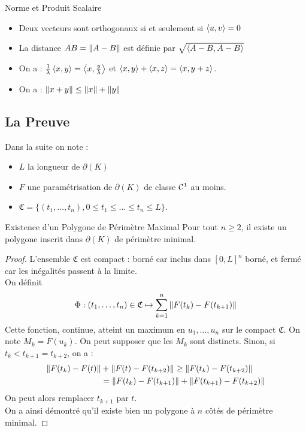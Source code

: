 \documentclass{cours}
\begin{document}
\begin{propositionfr}{Norme et Produit Scalaire}{}
    \begin{itemize}
        \item Deux vecteurs sont orthogonaux si et seulement si $\left\langle u, v \right\rangle = 0$
        \item La distance $AB = \left\lVert A - B \right\rVert$ est définie par $\sqrt{\left\langle A - B, A - B \right\rangle}$
        \item On a : $\frac{1}{\lambda} \left\langle x, y \right\rangle = \left\langle x, {y \over \lambda} \right\rangle$ et $\left\langle x, y \right\rangle + \left\langle x, z \right\rangle = \left\langle x, y + z \right\rangle$.
        \item On a : $\left\lVert x + y \right\rVert \leq \left\lVert x \right\rVert + \left\lVert y \right\rVert$
    \end{itemize}
\end{propositionfr}

\subsection{La Preuve}

Dans la suite on note :
\begin{itemize}
    \item $L$ la longueur de $\partial(K)$
    \item $F$ une paramétrisation de $\partial(K)$ de classe $\mathcal{C}^{1}$ au moins.
    \item $\mathfrak{C}= \{\left(t_{1}, \ldots, t_{n}\right), 0 \leq t_{1} \leq \dots \leq t_{n}\leq L\}$.
\end{itemize}

\begin{propositionfr}{Existence d'un Polygone de Périmètre Maximal}{}
    Pour tout $n \geq 2$, il existe un polygone inscrit dans $\partial(K)$ de périmètre minimal.
\end{propositionfr}
\begin{proof}
    L'ensemble $\mathfrak{C}$ est compact : borné car inclus dans $\left[0, L\right]^{n}$ borné, et fermé car les inégalités passent à la limite.\\
    On définit
    \[
        \Phi : (t_{1}, \ldots, t_{n}) \in \mathfrak{C}\mapsto \sum_{k = 1}^{n} \left\lVert F(t_{k}) - F(t_{k + 1}) \right\rVert
    \]
    Cette fonction, continue, atteint un maximum en $u_{1}, \ldots, u_{n}$ sur le compact $\mathfrak{C}$. On note $M_{k} = F(u_{k})$.
    On peut supposer que les $M_{k}$ sont distincts. Sinon, si $t_{k} < t_{k + 1} = t_{k + 2}$, on a :
    \[
        \begin{aligned}
            \left\lVert F(t_{k})- F(t) \right\rVert & + \left\lVert F(t) - F(t_{k +2}) \right\rVert \geq \left\lVert F(t_{k}) - F(t_{k + 2}) \right\rVert \\ & = \left\lVert F(t_{k}) - F(t_{k + 1}) \right\rVert + \left\lVert F(t_{k + 1}) - F(t_{k + 2}) \right\rVert
        \end{aligned}
    \]
    On peut alors remplacer $t_{k + 1}$ par $t$.\\
    On a ainsi démontré qu'il existe bien un polygone à $n$ côtés de périmètre minimal.
\end{proof}
\end{document}
